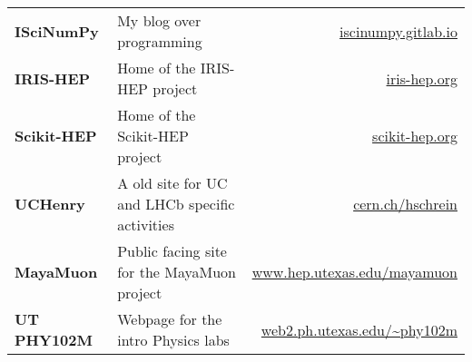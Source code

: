 \documentclass[10pt,letterpaper,english]{moderncv}
\begin{document}

\begin{tabularx}{\textwidth}{>{\bfseries}p{1.45in}Xr}
ISciNumPy & My blog over programming & \url{iscinumpy.gitlab.io} \\
IRIS-HEP & Home of the IRIS-HEP project & \url{iris-hep.org} \\
Scikit-HEP & Home of the Scikit-HEP project & \url{scikit-hep.org} \\
UCHenry & A old site for UC and LHCb specific activities & \url{cern.ch/hschrein}  \\
MayaMuon & Public facing site for the MayaMuon project & \url{www.hep.utexas.edu/mayamuon} \\
UT PHY102M & Webpage for the intro Physics labs & \url{web2.ph.utexas.edu/~phy102m}  \\
\end{tabularx}
\end{document}
